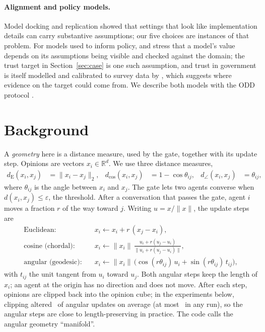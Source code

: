 \documentclass[11pt]{article}
\begin{document}
\paragraph{Alignment and policy models.}
Model docking and replication \citep{axtell1996,wilensky2007} showed that settings that look like implementation details can carry substantive assumptions; our five choices are instances of that problem.
For models used to inform policy, \citet{gilbert2018} and \citet{windrum2007} stress that a model's value depends on its assumptions being visible and checked against the domain; the trust target in Section~\ref{sec:case} is one such assumption, and trust in government is itself modelled and calibrated to survey data by \citet{gestefeld2023}, which suggests where evidence on the target could come from.
We describe both models with the ODD protocol \citep{grimm2020}.

\section{Background}
\label{sec:background}

A \emph{geometry} here is a distance measure, used by the gate, together with its update step.
Opinions are vectors $x_i \in \mathbb{R}^d$.
We use three distance measures,
\begin{align*}
d_{\mathrm{E}}(x_i,x_j) &= \lVert x_i - x_j \rVert_2, &
d_{\cos}(x_i,x_j) &= 1 - \cos\theta_{ij}, &
d_\angle(x_i,x_j) &= \theta_{ij},
\end{align*}
where $\theta_{ij}$ is the angle between $x_i$ and $x_j$.
The gate lets two agents converse when $d(x_i,x_j) \le \varepsilon$, the threshold.
After a conversation that passes the gate, agent $i$ moves a fraction $r$ of the way toward $j$.
Writing $u = x/\lVert x\rVert$, the update steps are
\begin{align*}
\text{Euclidean:}\quad & x_i \leftarrow x_i + r\,(x_j - x_i),\\
\text{cosine (chordal):}\quad & x_i \leftarrow \lVert x_i\rVert\,\frac{u_i + r(u_j - u_i)}{\lVert u_i + r(u_j - u_i)\rVert},\\
\text{angular (geodesic):}\quad & x_i \leftarrow \lVert x_i\rVert\,\bigl(\cos(r\theta_{ij})\,u_i + \sin(r\theta_{ij})\,t_{ij}\bigr),
\end{align*}
with $t_{ij}$ the unit tangent from $u_i$ toward $u_j$.
Both angular steps keep the length of $x_i$; an agent at the origin has no direction and does not move.
After each step, opinions are clipped back into the opinion cube; in the experiments below, clipping altered \VClipMean\ of angular updates on average (at most \VClipMax\ in any run), so the angular steps are close to length-preserving in practice.
The code calls the angular geometry ``manifold''.
\end{document}
